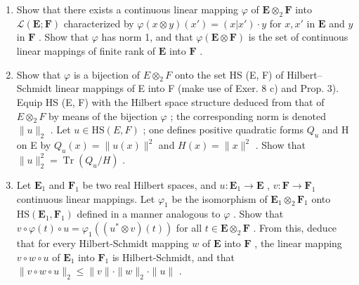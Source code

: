 \begin{enumerate}
\def\labelenumi{\alph{enumi})}
\item
  Show that there exists a continuous linear mapping \(\varphi\) of \(\mathbf{E} \otimes_2 \mathbf{F}\) into \(\mathcal{L}(\mathbf{E}; \mathbf{F})\) characterized by \(\varphi(x \otimes y)(x') = (x|x') \cdot y\) for \(x, x'\) in \(\mathbf{E}\) and \(y\) in \(\mathbf{F}\) . Show that \(\varphi\) has norm 1, and that \(\varphi(\mathbf{E} \otimes \mathbf{F})\) is the set of continuous linear mappings of finite rank of \(\mathbf{E}\) into \(\mathbf{F}\) .
\item
  Show that \(\varphi\) is a bijection of \(E \otimes_2 F\) onto the set HS (E, F) of Hilbert--Schmidt linear mappings of E into F (make use of Exer. 8 c) and Prop. 3). Equip HS (E, F) with the Hilbert space structure deduced from that of \(E \otimes_2 F\) by means of the bijection \(\varphi\) ; the corresponding norm is denoted \(\|u\|_2\) . Let \(u \in \mathrm{HS}(E, F)\) ; one defines positive quadratic forms \(Q_u\) and H on E by \(Q_u(x) = \|u(x)\|^2\) and \(H(x) = \|x\|^2\) . Show that \(\|u\|_2^2 = \operatorname{Tr}(Q_u / H)\) .
\item
  Let \(\mathbf{E}_1\) and \(\mathbf{F}_1\) be two real Hilbert spaces, and \(u: \mathbf{E}_1 \to \mathbf{E}\) , \(v: \mathbf{F} \to \mathbf{F}_1\) continuous linear mappings. Let \(\varphi_1\) be the isomorphism of \(\mathbf{E}_1 \otimes_2 \mathbf{F}_1\) onto \(\mathrm{HS}(\mathbf{E}_1, \mathbf{F}_1)\) defined in a manner analogous to \(\varphi\) . Show that \(v \circ \varphi(t) \circ u = \varphi_1((u^* \otimes v)(t))\) for all \(t \in \mathbf{E} \otimes_2 \mathbf{F}\) . From this, deduce that for every Hilbert-Schmidt mapping \(w\) of \(\mathbf{E}\) into \(\mathbf{F}\) , the linear mapping \(v \circ w \circ u\) of \(\mathbf{E}_1\) into \(\mathbf{F}_1\) is Hilbert-Schmidt, and that \(\|v \circ w \circ u\|_2 \leqslant \|v\| \cdot \|w\|_2 \cdot \|u\|\) .
\end{enumerate}

